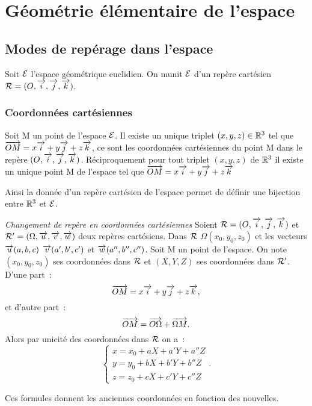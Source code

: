 \chapter{Géométrie élémentaire de l'espace}
\label{chap:geomEspace}
\minitoc
\minilof
\minilot
\section{Modes de repérage dans l'espace}
Soit $\mathcal{E}$ l'espace géométrique euclidien. On munit $\mathcal{E}$ d'un repère cartésien $\mathcal{R}=(O,\overrightarrow{i},\overrightarrow{j},\overrightarrow{k})$.

\subsection{Coordonnées cartésiennes}
\begin{defdef}
  Soit M un point de l'espace $\mathcal{E}$. Il existe un unique triplet $(x,y,z)\in\mathbb{R}^3$ tel que $\overrightarrow{OM}=x\overrightarrow{i}+y\overrightarrow{j}+z\overrightarrow{k}$, ce sont les coordonnées cartésiennes du point M dans le repère $(O,\overrightarrow{i},\overrightarrow{j},\overrightarrow{k})$. Réciproquement pour tout triplet $(x,y,z)$ de $\mathbb{R}^3$ il existe un unique point M de l'espace tel que $\overrightarrow{OM}=x\overrightarrow{i}+y\overrightarrow{j}+z\overrightarrow{k}$
\end{defdef}
Ainsi la donnée d'un repère cartésien de l'espace permet de définir une bijection entre $\mathbb{R}^3$ et $\mathcal{E}$.

\emph{Changement de repère en coordonnées cartésiennes}
Soient $\mathcal{R}=(O,\overrightarrow{i},\overrightarrow{j},\overrightarrow{k})$ et $\mathcal{R}'=(\Omega,\overrightarrow{u},\overrightarrow{v},\overrightarrow{w})$ deux repères cartésiens. Dans $\mathcal{R}$ $\Omega(x_0,y_0,z_0)$ et les vecteurs $\overrightarrow{u}(a,b,c)$ $\overrightarrow{v}(a',b',c')$ et $\overrightarrow{w}(a'',b'',c'')$. Soit M un point de l'espace. On note $(x_0,y_0,z_0)$ ses coordonnées dans $\mathcal{R}$ et $(X,Y,Z)$ ses coordonnées dans $\mathcal{R}'$. D'une part~:
\begin{equation}
  \overrightarrow{OM}=x\overrightarrow{i}+y\overrightarrow{j}+z\overrightarrow{k},
\end{equation}
et d'autre part~:
\begin{equation}
  \overrightarrow{OM}=\overrightarrow{O\Omega}+\overrightarrow{\Omega M}.
\end{equation}
Alors par unicité des coordonnées dans $\mathcal{R}$ on a~:
\begin{equation}
  \begin{cases}
    x=x_0+aX+a'Y+a''Z\\
    y=y_0+bX+b'Y+b''Z\\
    z=z_0+cX+c'Y+c''Z
  \end{cases}.
\end{equation}

\danger Ces formules donnent les \og{}anciennes\fg{} coordonnées en fonction des \og{}nouvelles\fg{}.

